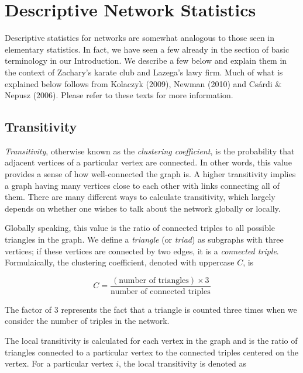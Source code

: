 \documentclass[12pt,twoside]{amherstthesis}
\begin{document}
  \chapter{Descriptive Network
  Statistics}\label{descriptive-network-statistics}
  
  Descriptive statistics for networks are somewhat analogous to those seen
  in elementary statistics. In fact, we have seen a few already in the
  section of basic terminology in our Introduction. We describe a few
  below and explain them in the context of Zachary's karate club and
  Lazega's lawy firm. Much of what is explained below follows from
  Kolaczyk (2009), Newman (2010) and Csárdi \& Nepusz (2006). Please refer
  to these texts for more information.
  
  \section{Transitivity}\label{transitivity}
  
  \emph{Transitivity}, otherwise known as the \emph{clustering
  coefficient}, is the probability that adjacent vertices of a particular
  vertex are connected. In other words, this value provides a sense of how
  well-connected the graph is. A higher transitivity implies a graph
  having many vertices close to each other with links connecting all of
  them. There are many different ways to calculate transitivity, which
  largely depends on whether one wishes to talk about the network globally
  or locally.
  
  Globally speaking, this value is the ratio of connected triples to all
  possible triangles in the graph. We define a \emph{triangle} (or
  \emph{triad}) as subgraphs with three vertices; if these vertices are
  connected by two edges, it is a \emph{connected triple}. Formulaically,
  the clustering coefficient, denoted with uppercase \(C\), is
  
  \[C = \frac {(\text{number of triangles}) \times 3} {\text{number of connected triples}} \]
  
  The factor of \(3\) represents the fact that a triangle is counted three
  times when we consider the number of triples in the network.
  
  The local transitivity is calculated for each vertex in the graph and is
  the ratio of triangles connected to a particular vertex to the connected
  triples centered on the vertex. For a particular vertex \(i\), the local
  transitivity is denoted as
  
\end{document}
